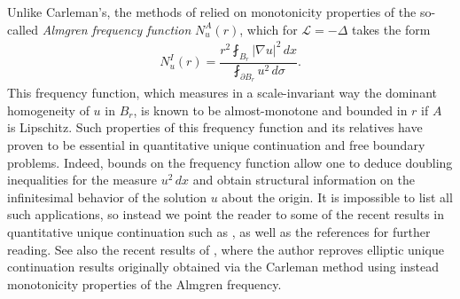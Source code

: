 \documentclass[12pt,leqno]{amsart}
\numberwithin{equation}{section}
\theoremstyle{definition}
\newcommand{\abs}[1]{\left \lvert #1 \right \rvert}
\begin{document}
Unlike Carleman's, the methods of \cite{GL86, GL87} relied on monotonicity properties of the so-called \textit{Almgren frequency function} $N_u^A(r)$, which for $\mathcal{L} = -\Delta$ takes the form
\begin{align*}
	N_u^I(r) = \dfrac{r^2 \fint_{B_r} \abs{\nabla u}^2 \, dx }{\fint_{\partial B_r} u^2 \, d\sigma}.
\end{align*}
This frequency function, which measures in a scale-invariant way the dominant homogeneity of $u$ in $B_r$, is known to be almost-monotone and bounded in $r$ if $A$ is Lipschitz. Such properties of this frequency function and its relatives have proven to be essential in quantitative unique continuation and free boundary problems. Indeed, bounds on the frequency function allow one to deduce doubling inequalities for the measure $u^2 \,dx$ and obtain structural information on the infinitesimal behavior of the solution $u$ about the origin. It is impossible to list all such applications, so instead we point the reader to some of the recent results in quantitative unique continuation such as \cite{CNV15, NV17-annals, NV17, LM18-23, LM18, Logunov18-poly, Gallegos23, CLMM24,  Foster25}, as well as the references \cite{LM-notes, Spolaor22, SVG24} for further reading. See also the recent results of \cite{Davey25}, where the author reproves elliptic unique continuation results originally obtained via the Carleman method using instead monotonicity properties of the Almgren frequency.
 
\vspace{0.5em}
 
\end{document}
